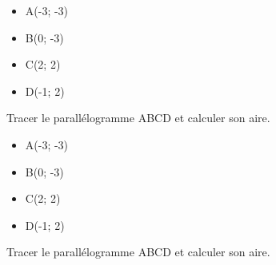 \documentclass[12pt,a4paper,french,fleqn]{beamer}
\begin{document}
\newcommand{\ax}{-3}
\newcommand{\ay}{-3}
\newcommand{\bx}{0}
\newcommand{\by}{-3}
\newcommand{\cx}{2}
\newcommand{\cy}{2}
\newcommand{\dx}{-1}
\newcommand{\dy}{2}




\begin{frame}
    \begin{minipage}[t]{0.65\textwidth}
        \begin{figure}
            \center
        \end{figure}
    \end{minipage}
    \hfil
    \vrule
    \hfil
    \begin{minipage}[t]{0.32\textwidth}
        
        \begin{itemize}
            \item A(\ax ; \ay)
            \item B(\bx ; \by)
            \item C(\cx ; \cy)
            \item D(\dx ; \dy)
        \end{itemize}
        Tracer le parallélogramme ABCD et calculer son aire.
    \end{minipage}
\end{frame}


\begin{frame}
    \begin{minipage}[t]{0.65\textwidth}
        \begin{figure}
            \center
        \end{figure}
    \end{minipage}
    \hfil
    \vrule
    \hfil
    \begin{minipage}[t]{0.32\textwidth}
        
        \begin{itemize}
            \item A(\ax ; \ay)
            \item B(\bx ; \by)
            \item C(\cx ; \cy)
            \item D(\dx ; \dy)
        \end{itemize}
        Tracer le parallélogramme ABCD et calculer son aire.
    \end{minipage}
\end{frame}
\end{document}
